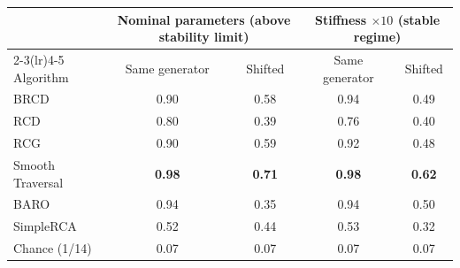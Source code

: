 \begin{tabular}{lcccc}
\toprule
& \multicolumn{2}{c}{Nominal parameters (above stability limit)} & \multicolumn{2}{c}{Stiffness $\times10$ (stable regime)} \\
\cmidrule(lr){2-3}\cmidrule(lr){4-5}
Algorithm & Same generator & Shifted & Same generator & Shifted \\
\midrule
BRCD & 0.90 & 0.58 & 0.94 & 0.49 \\
RCD & 0.80 & 0.39 & 0.76 & 0.40 \\
RCG & 0.90 & 0.59 & 0.92 & 0.48 \\
Smooth Traversal & \cellcolor{gray!20}\textbf{0.98} & \cellcolor{gray!20}\textbf{0.71} & \cellcolor{gray!20}\textbf{0.98} & \cellcolor{gray!20}\textbf{0.62} \\
BARO & 0.94 & 0.35 & 0.94 & 0.50 \\
SimpleRCA & 0.52 & 0.44 & 0.53 & 0.32 \\
\midrule
Chance (1/14) & 0.07 & 0.07 & 0.07 & 0.07 \\
\bottomrule
\end{tabular}
